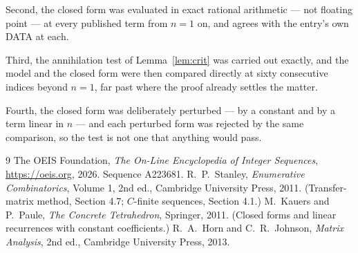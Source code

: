 \documentclass[11pt,a4paper]{article}
\theoremstyle{plain}
\theoremstyle{definition}
\begin{document}
Second, the closed form was evaluated in exact rational arithmetic --- not floating point ---
at every published term from $n=1$ on, and agrees with the entry's own DATA at each.

Third, the annihilation test of Lemma~\ref{lem:crit} was carried out exactly, and the model
and the closed form were then compared directly at sixty consecutive indices beyond
$n=1$, far past where the proof already settles the matter.

Fourth, the closed form was deliberately perturbed --- by a constant and by a term linear in
$n$ --- and each perturbed form was rejected by the same comparison, so the test is not one
that anything would pass.

\begin{thebibliography}{9}
 The OEIS Foundation, \emph{The On-Line Encyclopedia of Integer
Sequences}, \url{https://oeis.org}, 2026. Sequence A223681.
 R.~P.~Stanley, \emph{Enumerative Combinatorics}, Volume 1, 2nd ed.,
Cambridge University Press, 2011. (Transfer-matrix method, Section 4.7; $C$-finite sequences,
Section 4.1.)
 M.~Kauers and P.~Paule, \emph{The Concrete Tetrahedron}, Springer, 2011.
(Closed forms and linear recurrences with constant coefficients.)
 R.~A.~Horn and C.~R.~Johnson, \emph{Matrix Analysis}, 2nd ed., Cambridge
University Press, 2013.
\end{thebibliography}
\end{document}
